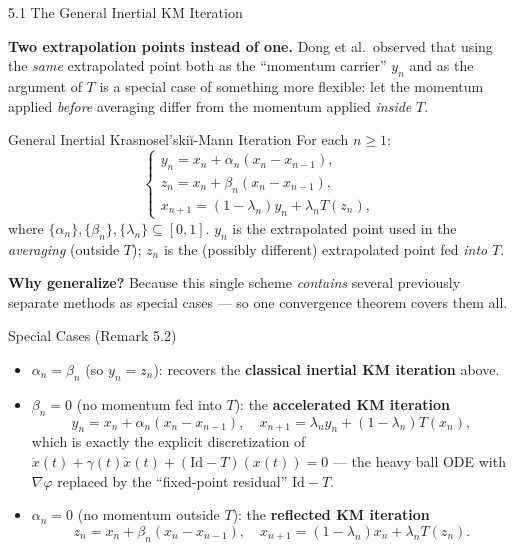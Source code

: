 \documentclass[aspectratio=169,10pt]{beamer}
\newcommand{\Id}{\mathrm{Id}}
\begin{document}
\begin{frame}[allowframebreaks]{5.1 The General Inertial KM Iteration}

  \textbf{Two extrapolation points instead of one.}  Dong et al.\
  observed that using the \emph{same} extrapolated point both as
  the ``momentum carrier'' $y_n$ and as the argument of $T$ is a
  special case of something more flexible: let the momentum
  applied \emph{before} averaging differ from the momentum applied
  \emph{inside} $T$.

  \begin{block}{General Inertial Krasnosel'ski\u{i}-Mann Iteration}
    For each $n\ge1$:
    \[
      \begin{cases}
        y_n = x_n + \alpha_n(x_n-x_{n-1}), \\
        z_n = x_n + \beta_n(x_n-x_{n-1}), \\
        x_{n+1} = (1-\lambda_n)y_n + \lambda_n T(z_n),
      \end{cases}
    \]
    where $\{\alpha_n\},\{\beta_n\},\{\lambda_n\}\subseteq[0,1]$.
    $y_n$ is the extrapolated point used in the \emph{averaging}
    (outside $T$); $z_n$ is the (possibly different) extrapolated
    point fed \emph{into} $T$.
  \end{block}

  \textbf{Why generalize?}  Because this single scheme
  \emph{contains} several previously separate methods as special
  cases --- so one convergence theorem covers them all.

  \framebreak

  \begin{block}{Special Cases (Remark 5.2)}
    \begin{itemize}
      \item $\alpha_n=\beta_n$ (so $y_n=z_n$): recovers the
            \textbf{classical inertial KM iteration} above.
      \item $\beta_n=0$ (no momentum fed into $T$): the
            \textbf{accelerated KM iteration}
            \[
              y_n = x_n+\alpha_n(x_n-x_{n-1}),\quad
              x_{n+1}=\lambda_n y_n+(1-\lambda_n)T(x_n),
            \]
            which is exactly the explicit discretization of
            $\ddot x(t)+\gamma(t)\dot x(t)+(\Id-T)(x(t))=0$ ---
            the heavy ball ODE with $\nabla\varphi$ replaced by
            the ``fixed-point residual'' $\Id-T$.
      \item $\alpha_n=0$ (no momentum outside $T$): the
            \textbf{reflected KM iteration}
            \[
              z_n = x_n+\beta_n(x_n-x_{n-1}),\quad
              x_{n+1}=(1-\lambda_n)x_n+\lambda_n T(z_n).
            \]
    \end{itemize}
  \end{block}


\end{frame}
\end{document}
